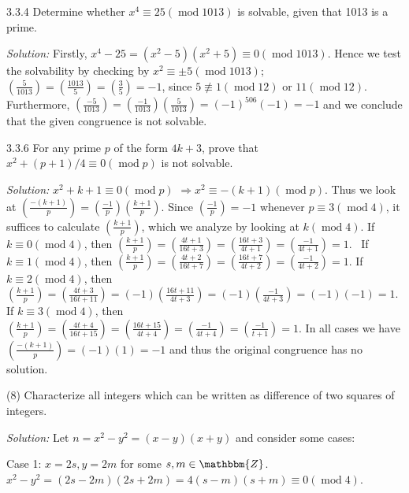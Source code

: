 \documentclass{letter}
\newcommand{\nequiv}{\not\equiv}
\newcommand{\tmem}[1]{{\em #1\/}}
\newcommand{\tmop}[1]{\ensuremath{\operatorname{#1}}}
\begin{document}
3.3.4 Determine whether $x^4 \equiv 25 (\tmop{mod} 1013)$ is solvable, given
that 1013 is a prime.

{\tmem{Solution:}} Firstly, $x^4 - 25 = (x^2 - 5) (x^2 + 5) \equiv 0
(\tmop{mod} 1013)$. Hence we test the solvability by checking by $x^2 \equiv
\pm 5 (\tmop{mod} 1013)$; $\left( \frac{5}{1013} \right) = \left(
\frac{1013}{5} \right) = \left( \frac{3}{5} \right) = - 1$, since $5 \nequiv 1
(\tmop{mod} 12)$ or $11 (\tmop{mod} 12)$. Furthermore, $\left( \frac{-
5}{1013} \right) = \left( \frac{- 1}{1013} \right) \left( \frac{5}{1013}
\right) = (- 1)^{506} (- 1) = - 1$ and we conclude that the given congruence
is not solvable.

3.3.6 For any prime $p$ of the form $4 k + 3$, prove that $x^2 + (p + 1) / 4
\equiv 0 (\tmop{mod} p)$ is not solvable.

{\tmem{Solution:}} $x^2 + k + 1 \equiv 0 (\tmop{mod} p)$ $\Rightarrow x^2
\equiv - (k + 1) (\tmop{mod} p)$. Thus we look at $\left( \frac{- (k + 1)}{p}
\right) = \left( \frac{- 1}{p} \right) \left( \frac{k + 1}{p} \right)$. Since
$\left( \frac{- 1}{p} \right) = - 1$ whenever $p \equiv 3 (\tmop{mod} 4)$, it
suffices to calculate $\left( \frac{k + 1}{p} \right)$, which we analyze by
looking at $k (\tmop{mod} 4)$. If $k \equiv 0 (\tmop{mod} 4)$, then $\left(
\frac{k + 1}{p} \right) = \left( \frac{4 t + 1}{16 t + 3} \right) = \left(
\frac{16 t + 3}{4 t + 1} \right) = \left( \frac{- 1}{4 t + 1} \right) = 1$. \
If $k \equiv 1 (\tmop{mod} 4)$, then $\left( \frac{k + 1}{p} \right) = \left(
\frac{4 t + 2}{16 t + 7} \right) = \left( \frac{16 t + 7}{4 t + 2} \right) =
\left( \frac{- 1}{4 t + 2} \right) = 1$. If $k \equiv 2 (\tmop{mod} 4)$, then
$\left( \frac{k + 1}{p} \right) = \left( \frac{4 t + 3}{16 t + 11} \right) =
(- 1) \left( \frac{16 t + 11}{4 t + 3} \right) = (- 1) \left( \frac{- 1}{4 t +
3} \right) = (- 1) (- 1) = 1$. If $k \equiv 3 (\tmop{mod} 4)$, then $\left(
\frac{k + 1}{p} \right) = \left( \frac{4 t + 4}{16 t + 15} \right) = \left(
\frac{16 t + 15}{4 t + 4} \right) = \left( \frac{- 1}{4 t + 4} \right) =
\left( \frac{- 1}{t + 1} \right) = 1$. In all cases we have $\left( \frac{- (k
+ 1)}{p} \right) = (- 1) (1) = - 1$ and thus the original congruence has no
solution.

(8) Characterize all integers which can be written as difference of two
squares of integers.

{\tmem{Solution:}} Let $n = x^2 - y^2 = (x - y) (x + y)$ and consider some
cases:

Case 1: $x = 2 s, y = 2 m$ for some $s, m \in \mathbbm{Z}$. $x^2 - y^2 = (2 s
- 2 m) (2 s + 2 m) = 4 (s - m) (s + m) \equiv 0 (\tmop{mod} 4)$.
\end{document}
